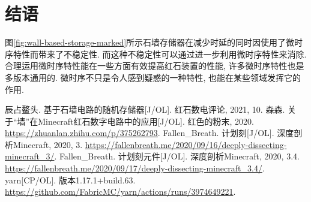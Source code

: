 \documentclass[UTF8,12pt,punct=kaiming,fontset=none]{ctexart}
\begin{document}
\section{结语}
图\ref{fig:wall-based-storage-marked}所示石墙存储器在减少时延的同时因使用了微时序特性而带来了不稳定性. 而这种不稳定性可以通过进一步利用微时序特性来消除. 合理运用微时序特性能在一些方面有效提高红石装置的性能, 许多微时序特性也是多版本通用的. 微时序不只是令人感到疑惑的一种特性, 也能在某些领域发挥它的作用.

\renewcommand{\refname}{主要参考文献}
\begin{thebibliography}{99}
    辰占鳌头. 基于石墙电路的随机存储器[J/OL]. 红石数电评论, 2021, 10.
    森森. 关于“墙”在Minecraft红石数字电路中的应用[J/OL]. 红色的粉末, 2020. \url{https://zhuanlan.zhihu.com/p/375262793}.
    Fallen\_Breath. 计划刻[J/OL]. 深度剖析Minecraft, 2020, 3. \url{https://fallenbreath.me/2020/09/16/deeply-dissecting-minecraft_3/}.
    Fallen\_Breath. 计划刻元件[J/OL]. 深度剖析Minecraft, 2020, 3.4. \url{https://fallenbreath.me/2020/09/17/deeply-dissecting-minecraft_3.4/}.
    yarn[CP/OL]. 版本1.17.1+build.63. \url{https://github.com/FabricMC/yarn/actions/runs/3974649221}.
\end{thebibliography}
\end{document}
